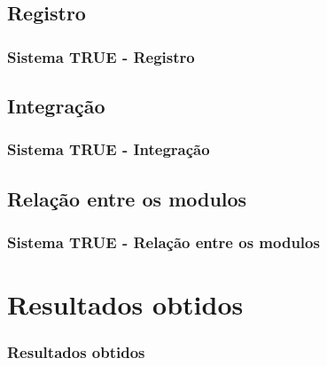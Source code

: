 \documentclass{beamer}
\begin{document}
    \subsection{Registro}
		\begin{frame}
	    	\frametitle{Sistema TRUE - Registro}
	    	
	    \end{frame}
    
    \subsection{Integração}
		\begin{frame}
	    	\frametitle{Sistema TRUE - Integração}
	    	
	    \end{frame}
    
    \subsection{Relação entre os modulos}
		\begin{frame}
	    	\frametitle{Sistema TRUE - Relação entre os modulos}
	    	
	    \end{frame}

\section{Resultados obtidos}

   	\begin{frame}
    	\frametitle{Resultados obtidos}
    \end{frame}

\end{document}
